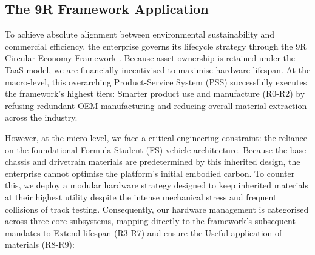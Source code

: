 \documentclass[11pt, a4paper]{report}
\numberwithin{equation}{section}
\begin{document}
\begin{refsection}
\subsection{The 9R Framework Application}
\label{sec:9r_framework_application}
\label{sec:ch7-9r-framework}
To achieve absolute alignment between environmental sustainability and commercial efficiency, the enterprise governs its lifecycle strategy through the 9R Circular Economy Framework \cite[p.~5]{potting_2017}. Because asset ownership is retained under the TaaS model, we are financially incentivised to maximise hardware lifespan. At the macro-level, this overarching Product-Service System (PSS) successfully executes the framework's highest tiers: Smarter product use and manufacture (R0-R2) by refusing redundant OEM manufacturing and reducing overall material extraction across the industry.

However, at the micro-level, we face a critical engineering constraint: the reliance on the foundational Formula Student (FS) vehicle architecture. Because the base chassis and drivetrain materials are predetermined by this inherited design, the enterprise cannot optimise the platform's initial embodied carbon. To counter this, we deploy a modular hardware strategy designed to keep inherited materials at their highest utility despite the intense mechanical stress and frequent collisions of track testing. Consequently, our hardware management is categorised across three core subsystems, mapping directly to the framework's subsequent mandates to Extend lifespan (R3-R7) and ensure the Useful application of materials (R8-R9):


\end{refsection}
\end{document}
